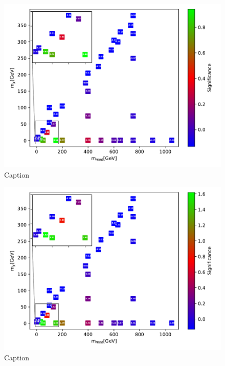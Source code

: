 \begin{figure}
    \centering
    \includegraphics[width = \textwidth]{Figures/Significances/significance_BDT_monoZ_All_level.pdf}
    \caption{Caption}
    \label{fig:my_label}
\end{figure}

\begin{figure}
    \centering
    \includegraphics[width = \textwidth]{Figures/Significances/significance_BDT_monoZ_Low_level.pdf}
    \caption{Caption}
    \label{fig:my_label}
\end{figure}


